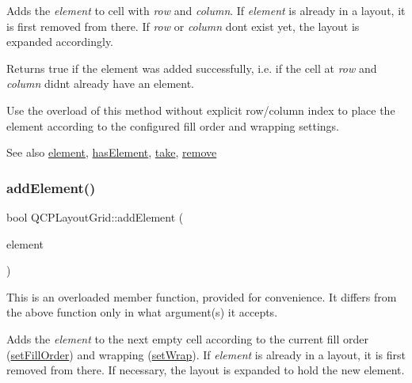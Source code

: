 Adds the {\itshape element} to cell with {\itshape row} and {\itshape column}. If {\itshape element} is already in a layout, it is first removed from there. If {\itshape row} or {\itshape column} don\textquotesingle{}t exist yet, the layout is expanded accordingly.

Returns true if the element was added successfully, i.\+e. if the cell at {\itshape row} and {\itshape column} didn\textquotesingle{}t already have an element.

Use the overload of this method without explicit row/column index to place the element according to the configured fill order and wrapping settings.

\begin{DoxySeeAlso}{See also}
\hyperlink{class_q_c_p_layout_grid_a602b426609b4411cf6a93c3ddf3a381a}{element}, \hyperlink{class_q_c_p_layout_grid_ab0cf4f7edc9414a3bfaddac0f46dc0a0}{has\+Element}, \hyperlink{class_q_c_p_layout_grid_aee961c2eb6cf8a85dcbc5a7d7b6c1a00}{take}, \hyperlink{class_q_c_p_layout_a6c58f537d8086f352576ab7c5b15d0bc}{remove} 
\end{DoxySeeAlso}
\mbox{\label{class_q_c_p_layout_grid_a4c44025dd25acd27e053cadfd448ad7b}} 
\subsubsection{\texorpdfstring{add\+Element()}{addElement()}\hspace{0.1cm}{\footnotesize\ttfamily [2/2]}}
{\footnotesize\ttfamily bool Q\+C\+P\+Layout\+Grid\+::add\+Element (\begin{DoxyParamCaption}\item[{\hyperlink{class_q_c_p_layout_element}{Q\+C\+P\+Layout\+Element} $\ast$}]{element }\end{DoxyParamCaption})}

This is an overloaded member function, provided for convenience. It differs from the above function only in what argument(s) it accepts.

Adds the {\itshape element} to the next empty cell according to the current fill order (\hyperlink{class_q_c_p_layout_grid_affc2f3cfd22f28698c5b29b960d2a391}{set\+Fill\+Order}) and wrapping (\hyperlink{class_q_c_p_layout_grid_ab36af18d77e4428386d02970382ee598}{set\+Wrap}). If {\itshape element} is already in a layout, it is first removed from there. If necessary, the layout is expanded to hold the new element.

